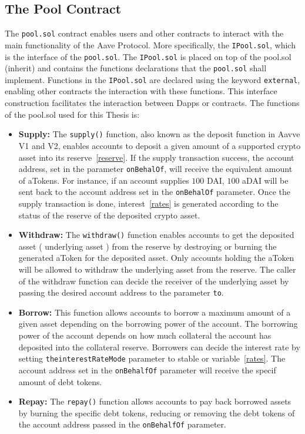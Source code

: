 \documentclass[11pt,a4paper]{report}
\begin{document}
\subsection{The Pool Contract}
The \verb|pool.sol|\cite{poolContract} contract enables users and other contracts to interact with the main functionality of the Aave Protocol. More specifically, the \verb|IPool.sol|, which is the interface of the \verb|pool.sol|. The \verb|IPool.sol| is placed on top of the pool.sol (inherit) and contains the functions declarations that the \verb|pool.sol| shall implement. Functions in the \verb|IPool.sol| are declared using the keyword \verb|external|, enabling other contracts the interaction with these functions. This interface construction facilitates the interaction between Dapps or contracts. The functions of the pool.sol used for this Thesis is: 
\begin{itemize}
	\item{\textbf{Supply:}} The \verb|supply()| function, also known as the deposit function in Aavve V1 and V2, enables accounts to deposit a given amount of a supported crypto asset into its reserve~\ref{reserve}. If the supply transaction success, the account address, set in the parameter \verb|onBehalOf|, will receive the equivalent amount of aTokens. For instance, if an account supplies $100$ DAI, $100$ aDAI will be sent back to the account address set in the \verb|onBehalOf| parameter. Once the supply transaction is done, interest~\ref{rates} is generated according to the status of the reserve of the deposited crypto asset.
	\item{\textbf{Withdraw:}} The \verb|withdraw()| function enables accounts to get the deposited asset ( underlying asset ) from the reserve by destroying or burning the generated aToken for the deposited asset. Only accounts holding the aToken will be allowed to withdraw the underlying asset from the reserve. The caller of the withdraw function can decide the receiver of the underlying asset by passing the desired account address to the parameter \verb|to|.
	\item{\textbf{Borrow:}} This function allows accounts to borrow a maximum amount of a given asset depending on the borrowing power of the account. The borrowing power of the account depends on how much collateral the account has deposited into the collateral reserve. Borrowers can decide the interest rate by setting \verb|theinterestRateMode| parameter to stable or variable~\ref{rates}. The account address set in the \verb|onBehalfOf| parameter will receive the specif amount of debt tokens.
	\item{\textbf{Repay:}} The \verb|repay()| function allows accounts to pay back borrowed assets by burning the specific debt tokens, reducing or removing the debt tokens of the account address passed in the \verb|onBehalfOf| parameter. 	
\end{itemize}
\end{document}
